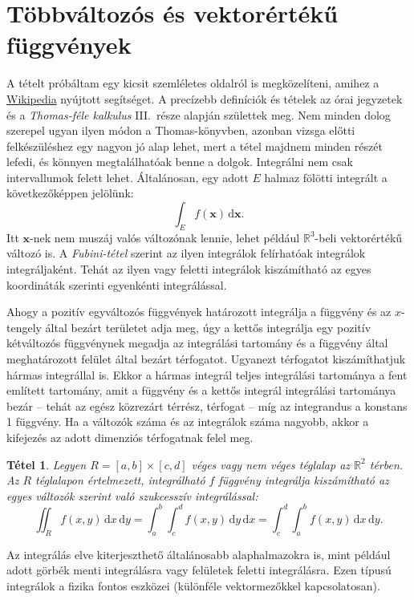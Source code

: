\documentclass[DIV=15,appendixprefix]{scrreprt}
\newtheorem*{tetel}{Tétel}
\theoremstyle{definition}
\theoremstyle{remark}
\begin{document}
\section{Többváltozós és vektorértékű függvények}
A tételt próbáltam egy kicsit szemléletes oldalról is megközelíteni, amihez a
\href{https://www.wikipedia.org/}{Wikipedia} nyújtott
segítséget. A precízebb definíciók és tételek az órai jegyzetek és a \emph{Thomas-féle kalkulus}
III.~része \cite[16.~fejezet]{Thomas} alapján születtek meg. Nem minden dolog szerepel ugyan ilyen
módon a Thomas-könyvben, azonban vizsga előtti felkészüléshez egy nagyon jó alap lehet, mert a tétel
majdnem minden részét lefedi, és könnyen megtalálhatóak benne a dolgok.
%
Integrálni nem csak intervallumok felett lehet. Általánosan, egy adott $ E $ halmaz fölötti
integrált a következőképpen jelölünk:
\begin{equation*}
	\int_{ E } f \left( \mathbf{ x } \right) \, \mathrm{ d } \mathbf{ x }.
\end{equation*}
Itt $ \mathbf{ x } $-nek nem muszáj valós változónak lennie, lehet például
$ \mathbb{ R }^{ 3 }$-beli vektorértékű változó is. A \emph{Fubini-tétel} szerint az ilyen
integrálok felírhatóak integrálok integráljaként. Tehát az ilyen  vagy
 feletti integrálok kiszámítható az egyes koordináták szerinti egyenkénti
integrálással.

Ahogy a pozitív egyváltozós függvények határozott integrálja a függvény és az $ x $-tengely által
bezárt területet adja meg, úgy a kettős integrálja egy pozitív kétváltozós függvénynek megadja az
integrálási tartomány és a függvény által meghatározott felület által bezárt térfogatot. Ugyanezt
térfogatot kiszámíthatjuk hármas integrállal is. Ekkor a hármas integrál teljes integrálási
tartománya a fent említett tartomány, amit a függvény és a kettős integrál integrálási tartománya
bezár -- tehát az egész közrezárt térrész, térfogat -- míg az integrandus a konstans 1 függvény. Ha
a változók száma és az integrálok száma nagyobb, akkor a kifejezés az adott dimenziós térfogatnak
felel meg.

\begin{tetel}
	Legyen $ R = \left[ a,{} b \right] \times \left[ c,{} d \right]$ véges vagy nem véges téglalap
	az $ \mathbb{ R }^{ 2 } $ térben. Az $ R $ téglalapon értelmezett, integrálható $ f $ függvény
	integrálja kiszámítható az egyes változók szerint való szukcesszív integrálással:
	\begin{equation*}
		\iint_{ R } f \left( x,{} y  \right) \, \mathrm{ d } x \, \mathrm{ d } y = \int_{ a }^{ b }
		\int_{ c }^{ d } f \left( x,{} y  \right) \, \mathrm{ d } y \, \mathrm{ d } x =
		\int_{ c }^{ d } \int_{ a }^{ b } f \left( x,{} y  \right) \, \mathrm{ d } x \,
		\mathrm{ d } y.
	\end{equation*}
\end{tetel}
%
Az integrálás elve kiterjeszthető általánosabb alaphalmazokra is, mint például adott görbék menti
integrálásra vagy felületek feletti integrálásra. Ezen típusú integrálok a fizika fontos eszközei
(különféle vektormezőkkel kapcsolatosan).
\end{document}

